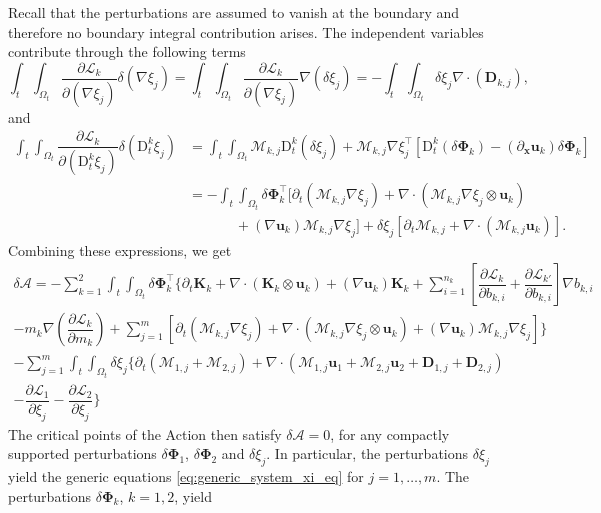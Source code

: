 \documentclass{myclass}
\newcommand{\Act}{\mathscr{A}}
\newcommand{\Lag}{\mathscr{L}}
\newcommand{\Dt}{\mathrm{D}_t}
\newcommand{\Traj}{\bm{\Phi}}
\newcommand{\txint}{\int_t\!\int_{\Omega_t}}
\newcommand{\vel}{\bm{u}}
\newcommand{\pth}[1]  {\left( #1 \right)}
\newcommand{\brck}[1]  {\left[ #1 \right]}
\begin{document}
Recall that the perturbations are assumed to vanish at the boundary and therefore no boundary integral contribution arises. The independent variables contribute through the following terms
\begin{equation}
\txint\dfrac{\partial\Lag_k}{\partial\pth{\nabla\xi_j}}\delta\pth{\nabla\xi_j} = \txint\dfrac{\partial\Lag_k}{\partial\pth{\nabla\xi_j}}\nabla\pth{\delta\xi_j} = -\txint\delta\xi_j\nabla\cdot\pth{\bm{D}_{k,j}},
\end{equation}
and
\begin{equation}
\begin{split}
\txint\dfrac{\partial\Lag_k}{\partial\pth{\Dt^k\xi_j}}\delta\pth{\Dt^k\xi_j} &= \txint\mathscr{M}_{k,j}\Dt^k\pth{\delta\xi_j} + \mathscr{M}_{k,j}\nabla\xi_j^\top\brck{\Dt^k\pth{\delta\Traj_k} - \pth{\partial_{\bm{x}}\vel_k}\delta\Traj_k}\\
&= -\txint\delta\Traj_k^\top\bigg[\partial_t\pth{\mathscr{M}_{k,j}\nabla\xi_j} + \nabla\cdot\pth{\mathscr{M}_{k,j}\nabla\xi_j\otimes\vel_k} \\
& \hspace{40pt}  + \pth{\nabla\vel_k}\mathscr{M}_{k,j}\nabla\xi_j\bigg] +\delta\xi_j\brck{\partial_t\mathscr{M}_{k,j}+\nabla\cdot\pth{\mathscr{M}_{k,j}\vel_k}}.
\end{split}
\end{equation}
Combining these expressions, we get
\begin{multline}
\delta\Act = -\sum_{k=1}^{2}\txint\delta\Traj_k^\top\bigg\{ \partial_t\bm{K}_k + \nabla\cdot\pth{\bm{K}_k\otimes\vel_k} + \pth{\nabla\vel_k}\bm{K}_k 
+ \sum_{i=1}^{n_k}\brck{\dfrac{\partial\Lag_k}{\partial b_{k,i}} +\dfrac{\partial \Lag_{k'}}{\partial b_{k,i}}}\nabla b_{k,i} \\
- m_k\nabla\pth{\dfrac{\partial\Lag_k}{\partial m_k}}  + \sum_{j=1}^{m}\brck{ \partial_t\pth{\mathscr{M}_{k,j}\nabla\xi_j} + \nabla\cdot\pth{\mathscr{M}_{k,j}\nabla\xi_j\otimes\vel_k}  + \pth{\nabla\vel_k}\mathscr{M}_{k,j}\nabla\xi_j}\bigg\} \\
- \sum_{j=1}^{m}\txint\delta\xi_j\bigg\{\partial_t\pth{\mathscr{M}_{1,j}+\mathscr{M}_{2,j}}+\nabla\cdot\pth{\mathscr{M}_{1,j}\vel_1 + \mathscr{M}_{2,j}\vel_2 + \bm{D}_{1,j} + \bm{D}_{2,j}} \\ -\dfrac{\partial\Lag_1}{\partial\xi_j} -\dfrac{\partial\Lag_2}{\partial\xi_j} \bigg\}
\end{multline}
The critical points of the Action then satisfy $\delta\Act=0$, for any compactly supported perturbations $\delta\Traj_1$, $\delta\Traj_2$ and $\delta\xi_j$. In particular, the perturbations $\delta\xi_j$ yield the generic equations \eqref{eq:generic_system_xi_eq} for $j=1,\ldots,m$. The perturbations $\delta\Traj_k$, $k=1,2$, yield
\end{document}
